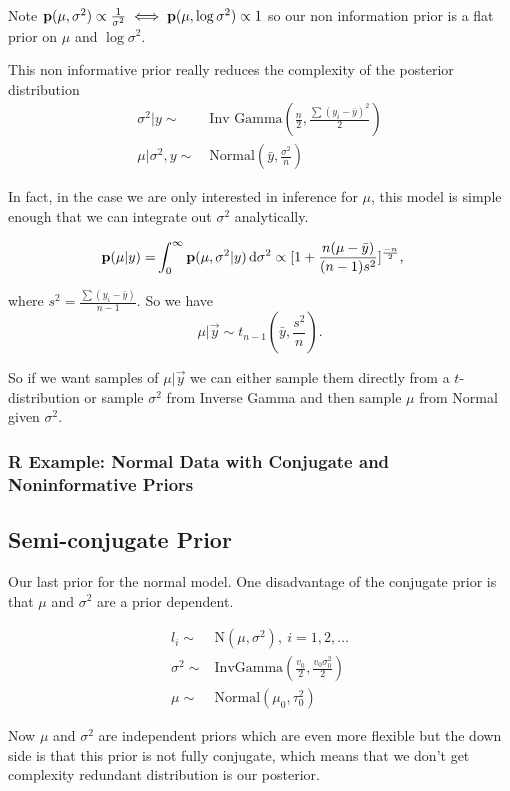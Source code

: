 Note ${\mathbf p}(\mu, \sigma^2) \propto \frac{1}{\sigma^2} \iff {\mathbf p}(\mu, \log \sigma^2) \propto 1$ so our non information prior is a flat prior on $\mu$ and $\log \sigma^2$.

This non informative prior really reduces the complexity of the posterior distribution
\begin{align*}
    \sigma^2| y 
    \sim&~ \text{Inv Gamma}(\frac{n}{2}, \frac{\sum(y_i - \bar{y})^2}{2})\\
    \mu| \sigma^2,y \sim&~ \text{Normal}(\bar{y}, \frac{\sigma^2}{n})
\end{align*}

In fact, in the case we are only interested in inference for $\mu$, this model is simple enough that we can integrate out $\sigma^2$ analytically.


\begin{align*}
    {\mathbf p}(\mu| y) 
    =& \int_0^\infty {\mathbf p}(\mu, \sigma^2| y) \mathop{}\!\mathrm{d} \sigma^2
    \propto
    [1 + \frac{n(\mu - \bar{y})}{(n-1)s^2}]^{\frac{-n}{2}},
\end{align*}

where $s^2 = \frac{\sum(y_i - \bar{y})}{n - 1}$. So we have 
\[
\mu| \vec{y} \sim t_{n-1}(\bar{y}, \frac{s^2}{n}).
\]

So if we want samples of $\mu|\vec{y}$ we can either sample them directly from a $t$-distribution or sample $\sigma^2$ from Inverse Gamma and then sample $\mu$ from Normal given $\sigma^2$.

\subsubsection{R Example: Normal Data with Conjugate and Noninformative Priors}

\subsection{Semi-conjugate Prior}
Our last prior for the normal model. One disadvantage of the conjugate prior is that $\mu$ and $\sigma^2$ are a prior dependent.

\begin{align*}
    l_i \sim& \text{N}(\mu, \sigma^2),~i=1,2,\dots\\
    \sigma^2 \sim& \text{InvGamma}(\frac{v_0}{2}, \frac{v_0 \sigma^2_0}{2})\\
    \mu \sim& \text{Normal}(\mu_0, \tau_0^2)
\end{align*}

Now $\mu$ and $\sigma^2$ are independent priors which are even more flexible but the down side is that this prior is not fully conjugate, which means that we don't get complexity redundant distribution is our posterior.


